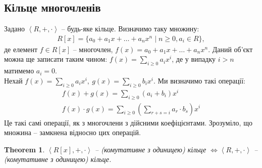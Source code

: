 \documentclass[a4paper, 10pt]{article}
\theoremstyle{theoremdd}
\newtheorem{theorem}{Theorem}[subsection]
\theoremstyle{theoremdd}
\theoremstyle{theoremdd}
\theoremstyle{theoremdd}
\theoremstyle{theoremdd}
\theoremstyle{theoremdd}
\theoremstyle{theoremdd}
\theoremstyle{theoremdd}
\theoremstyle{theoremdd}
\theoremstyle{theoremdd}
\theoremstyle{theoremdd}
\theoremstyle{theoremdd}
\theoremstyle{theoremdd}
\theoremstyle{theoremdd}
\theoremstyle{theoremdd}
\begin{document}
\subsection{Кільце многочленів}
Задано $\left< R,+,\cdot \right>$ -- будь-яке кільце. Визначимо таку множину:
\begin{align*}
R[x] = \{a_0 + a_1 x + \dots + a_n x^n \mid n \geq 0, a_i \in R\},
\end{align*}
де елемент $f \in R[x]$ -- многочлен, $f(x) = a_0 + a_1 x + \dots + a_n x^n$. Даний об'єкт можна ще записати таким чином: $f(x) = \displaystyle\sum_{i \geq 0} a_i x^i$, де у випадку $i > n$ матимемо $a_i = 0$.\\
Нехай $f(x) = \displaystyle\sum_{i \geq 0} a_i x^i,\ g(x) =\sum_{i \geq 0} b_i x^i$. Ми визначимо такі операції:
\begin{align*}
f(x) + g(x) = \displaystyle\sum_{i \geq 0} (a_i + b_i) x^i \\
f(x) \cdot g(x) = \displaystyle\sum_{i \geq 0} \left(\sum_{r + s = i} a_r \cdot b_s \right) x^i
\end{align*}
Це такі самі операції, як з многочлени з дійсними коефіцієнтами. Зрозуміло, що множина -- замкнена відносно цих операцій.

\begin{theorem}
$\left<R[x],+,\cdot\right>$ -- (комутативне з одиницею) кільце $\iff \left< R,+,\cdot \right>$ -- (комутативне з одиницею) кільце.
\end{theorem}
\end{document}
